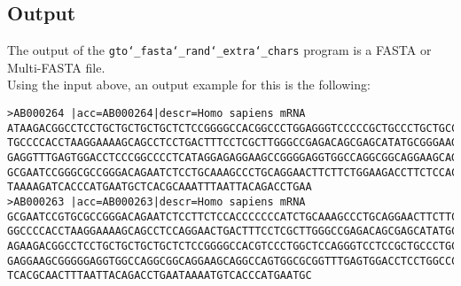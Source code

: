 \subsection*{Output}
The output of the \texttt{gto\char`_fasta\char`_rand\char`_extra\char`_chars} program is a FASTA or Multi-FASTA file.\\
Using the input above, an output example for this is the following:
\begin{lstlisting}
>AB000264 |acc=AB000264|descr=Homo sapiens mRNA 
ATAAGACGGCCTCCTGCTGCTGCTGCTCTCCGGGGCCACGGCCCTGGAGGGTCCCCCGCTGCCCTGCTGCCATTGTCCCC
TGCCCCACCTAAGGAAAAGCAGCCTCCTGACTTTCCTCGCTTGGGCCGAGACAGCGAGCATATGCGGGAAGCGGCAGGAA
GAGGTTTGAGTGGACCTCCCGGCCCCTCATAGGAGAGGAAGCCGGGGAGGTGGCCAGGCGGCAGGAAGCAGGCCAGTGTC
GCGAATCCGGGCGCCGGGACAGAATCTCCTGCAAAGCCCTGCAGGAACTTCTTCTGGAAGACCTTCTCCACCCCCCCTTG
TAAAAGATCACCCATGAATGCTCACGCAAATTTAATTACAGACCTGAA
>AB000263 |acc=AB000263|descr=Homo sapiens mRNA 
GCGAATCCGTGCGCCGGGACAGAATCTCCTTCTCCACCCCCCCATCTGCAAAGCCCTGCAGGAACTTCTTCTGGAAGACC
GGCCCCACCTAAGGAAAAGCAGCCTCCAGGAACTGACTTTCCTCGCTTGGGCCGAGACAGCGAGCATATGCGGGAAGCGG
AGAAGACGGCCTCCTGCTGCTGCTGCTCTCCGGGGCCACGTCCCTGGCTCCAGGGTCCTCCGCTGCCCTGCTGCCATTGC
GAGGAAGCGGGGGAGGTGGCCAGGCGGCAGGAAGCAGGCCAGTGGCGCGGTTTGAGTGGACCTCCTGGCCCCTCATAGGA
TCACGCAACTTTAATTACAGACCTGAATAAAATGTCACCCATGAATGC
\end{lstlisting}